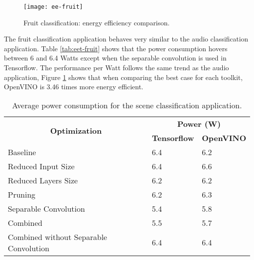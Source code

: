 \begin{figure}[thbp]
	\centering
	\texttt{[image: ee-fruit]}
	\caption{Fruit classification: energy efficiency comparison.}
	\label{fig:ee-fruit}
\end{figure}

The fruit classification application behaves very similar to the audio classification application. Table \ref{tab:eet-fruit} shows that the power consumption hovers between 6 and 6.4 Watts except when the separable convolution is used in Tensorflow. The performance per Watt follows the same trend as the audio application, Figure \ref{fig:ee-fruit} shows that when comparing the best case for each toolkit, OpenVINO is 3.46 times more energy efficient.

\begin{table}[thbp]
\centering
\caption{Average power consumption for the scene classification application.}
\label{tab:eet-scene}
\begin{tabular}{|l|l|l|}
\hline
\multicolumn{1}{|c|}{\multirow{2}{*}{\textbf{Optimization}}} & \multicolumn{2}{c|}{\textbf{Power (W)}}                                           \\ \cline{2-3} 
\multicolumn{1}{|c|}{}                                       & \multicolumn{1}{c|}{\textbf{Tensorflow}} & \multicolumn{1}{c|}{\textbf{OpenVINO}} \\ \hline
Baseline                                                     & 6.4                 & 6.2               \\ \hline
Reduced Input Size                                           & 6.4                 & 6.6               \\ \hline
Reduced Layers Size                                          & 6.2                 & 6.2               \\ \hline
Pruning                                                      & 6.2                 & 6.3               \\ \hline
Separable Convolution                                        & 5.4                 & 5.8               \\ \hline
Combined                                                     & 5.5                 & 5.7               \\ \hline
Combined without Separable Convolution                       & 6.4                 & 6.4               \\ \hline
\end{tabular}
\end{table}

